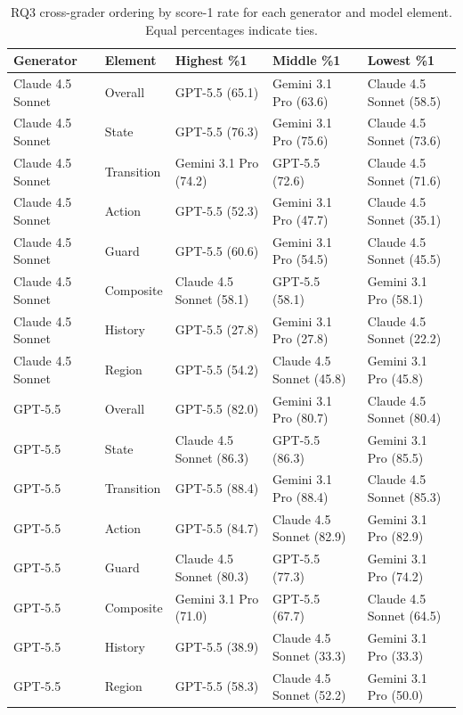 \begin{table}[t]
\centering
\small
\caption{RQ3 cross-grader ordering by score-1 rate for each generator and model element. Equal percentages indicate ties.}
\label{tab:rq3-cross-grader-score1-rankings}
\begin{tabular}{lllll}
\toprule
Generator & Element & Highest \%1 & Middle \%1 & Lowest \%1 \\
\midrule
Claude 4.5 Sonnet & Overall & GPT-5.5 (65.1) & Gemini 3.1 Pro (63.6) & Claude 4.5 Sonnet (58.5) \\
Claude 4.5 Sonnet & State & GPT-5.5 (76.3) & Gemini 3.1 Pro (75.6) & Claude 4.5 Sonnet (73.6) \\
Claude 4.5 Sonnet & Transition & Gemini 3.1 Pro (74.2) & GPT-5.5 (72.6) & Claude 4.5 Sonnet (71.6) \\
Claude 4.5 Sonnet & Action & GPT-5.5 (52.3) & Gemini 3.1 Pro (47.7) & Claude 4.5 Sonnet (35.1) \\
Claude 4.5 Sonnet & Guard & GPT-5.5 (60.6) & Gemini 3.1 Pro (54.5) & Claude 4.5 Sonnet (45.5) \\
Claude 4.5 Sonnet & Composite & Claude 4.5 Sonnet (58.1) & GPT-5.5 (58.1) & Gemini 3.1 Pro (58.1) \\
Claude 4.5 Sonnet & History & GPT-5.5 (27.8) & Gemini 3.1 Pro (27.8) & Claude 4.5 Sonnet (22.2) \\
Claude 4.5 Sonnet & Region & GPT-5.5 (54.2) & Claude 4.5 Sonnet (45.8) & Gemini 3.1 Pro (45.8) \\
GPT-5.5 & Overall & GPT-5.5 (82.0) & Gemini 3.1 Pro (80.7) & Claude 4.5 Sonnet (80.4) \\
GPT-5.5 & State & Claude 4.5 Sonnet (86.3) & GPT-5.5 (86.3) & Gemini 3.1 Pro (85.5) \\
GPT-5.5 & Transition & GPT-5.5 (88.4) & Gemini 3.1 Pro (88.4) & Claude 4.5 Sonnet (85.3) \\
GPT-5.5 & Action & GPT-5.5 (84.7) & Claude 4.5 Sonnet (82.9) & Gemini 3.1 Pro (82.9) \\
GPT-5.5 & Guard & Claude 4.5 Sonnet (80.3) & GPT-5.5 (77.3) & Gemini 3.1 Pro (74.2) \\
GPT-5.5 & Composite & Gemini 3.1 Pro (71.0) & GPT-5.5 (67.7) & Claude 4.5 Sonnet (64.5) \\
GPT-5.5 & History & GPT-5.5 (38.9) & Claude 4.5 Sonnet (33.3) & Gemini 3.1 Pro (33.3) \\
GPT-5.5 & Region & GPT-5.5 (58.3) & Claude 4.5 Sonnet (52.2) & Gemini 3.1 Pro (50.0) \\

\end{tabular}
\end{table}
